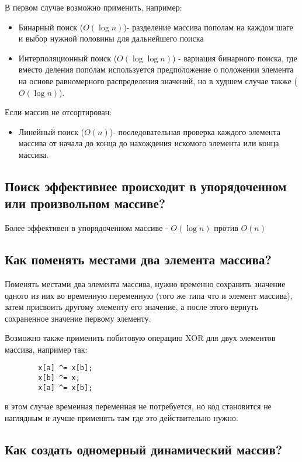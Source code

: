 \documentclass[a4paper,12pt]{article}
\begin{document}
	В первом случае возможно применить, например:
	
	\begin{itemize}
		\item Бинарный поиск ($O(\log n)$)- разделение массива пополам на каждом шаге и выбор нужной половины для дальнейшего поиска
		\item Интерполяционный поиск ($O(\log\log n)$) - вариация бинарного поиска, где вместо деления пополам используется предположение о положении элемента на основе равномерного распределения значений, но в худшем случае также ($O(\log n)$).	 
	\end{itemize}
	
	Если массив не отсортирован:
	
	\begin{itemize}
		\item Линейный поиск ($O(n)$)- последовательная проверка каждого элемента массива от начала до конца до нахождения искомого элемента или конца массива.
	\end{itemize}

	
	\subsection{Поиск эффективнее происходит в упорядоченном или произвольном массиве?}
	
	Более эффективен в упорядоченном массиве - $O(\log n)$  против $O(n)$
	
	\subsection{Как поменять местами два элемента массива?}
	
	Поменять местами два элемента массива, нужно временно сохранить значение одного из них во временную переменную (того же типа что и элемент массива), затем присвоить другому элементу его значение, а после этого вернуть сохраненное значение первому элементу.
	
	Возможно также применить побитовую операцию XOR для двух элементов массива, например так:
	\begin{lstlisting}
		x[a] ^= x[b];
		x[b] ^= x;
		x[a] ^= x[b];
	\end{lstlisting}
	в этом случае временная переменная не потребуется, но код становится не наглядным и лучше применять там где это действительно нужно.
	
	\subsection{Как создать одномерный динамический массив?}
	
\end{document}
